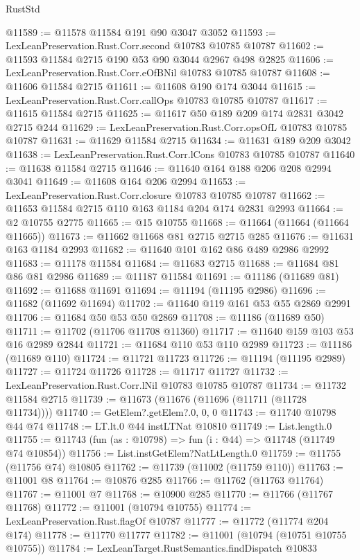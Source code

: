 \begin{lexlean}{RustStd}
\begin{coremodule}
@11589 := @11578 @11584 @191 @90 @3047 @3052
@11593 := LexLeanPreservation.Rust.Corr.second @10783 @10785 @10787
@11602 := @11593 @11584 @2715 @190 @53 @90 @3044 @2967 @498 @2825
@11606 := LexLeanPreservation.Rust.Corr.eOfBNil @10783 @10785 @10787
@11608 := @11606 @11584 @2715
@11611 := @11608 @190 @174 @3044
@11615 := LexLeanPreservation.Rust.Corr.callOps @10783 @10785 @10787
@11617 := @11615 @11584 @2715
@11625 := @11617 @50 @189 @209 @174 @2831 @3042 @2715 @244
@11629 := LexLeanPreservation.Rust.Corr.opsOfL @10783 @10785 @10787
@11631 := @11629 @11584 @2715
@11634 := @11631 @189 @209 @3042
@11638 := LexLeanPreservation.Rust.Corr.lCons @10783 @10785 @10787
@11640 := @11638 @11584 @2715
@11646 := @11640 @164 @188 @206 @208 @2994 @3041
@11649 := @11608 @164 @206 @2994
@11653 := LexLeanPreservation.Rust.Corr.closure @10783 @10785 @10787
@11662 := @11653 @11584 @2715 @110 @163 @1184 @204 @174 @2831 @2993
@11664 := @2 @10755 @2775
@11665 := @15 @10755
@11668 := @11664 (@11664 (@11664 @11665))
@11673 := @11662 @11668 @81 @2715 @2715 @285
@11676 := @11631 @163 @1184 @2993
@11682 := @11640 @101 @162 @86 @489 @2986 @2992
@11683 := @11178 @11584
@11684 := @11683 @2715
@11688 := @11684 @81 @86 @81 @2986
@11689 := @11187 @11584
@11691 := @11186 (@11689 @81)
@11692 := @11688 @11691
@11694 := @11194 (@11195 @2986)
@11696 := @11682 (@11692 @11694)
@11702 := @11640 @119 @161 @53 @55 @2869 @2991
@11706 := @11684 @50 @53 @50 @2869
@11708 := @11186 (@11689 @50)
@11711 := @11702 (@11706 @11708 @11360)
@11717 := @11640 @159 @103 @53 @16 @2989 @2844
@11721 := @11684 @110 @53 @110 @2989
@11723 := @11186 (@11689 @110)
@11724 := @11721 @11723
@11726 := @11194 (@11195 @2989)
@11727 := @11724 @11726
@11728 := @11717 @11727
@11732 := LexLeanPreservation.Rust.Corr.lNil @10783 @10785 @10787
@11734 := @11732 @11584 @2715
@11739 := @11673 (@11676 (@11696 (@11711 (@11728 @11734))))
@11740 := GetElem?.getElem?.{0, 0, 0}
@11743 := @11740 @10798 @44 @74
@11748 := LT.lt.{0} @44 instLTNat @10810
@11749 := List.length.{0}
@11755 := @11743 (fun (as : @10798) => fun (i : @44) => @11748 (@11749 @74 @10854))
@11756 := List.instGetElem?NatLtLength.{0}
@11759 := @11755 (@11756 @74) @10805
@11762 := @11739 (@11002 (@11759 @110))
@11763 := @11001 @8
@11764 := @10876 @285
@11766 := @11762 (@11763 @11764)
@11767 := @11001 @7
@11768 := @10900 @285
@11770 := @11766 (@11767 @11768)
@11772 := @11001 (@10794 @10755)
@11774 := LexLeanPreservation.Rust.flagOf @10787
@11777 := @11772 (@11774 @204 @174)
@11778 := @11770 @11777
@11782 := @11001 (@10794 (@10751 @10755 @10755))
@11784 := LexLeanTarget.RustSemantics.findDispatch @10833

\end{coremodule}
\end{lexlean}

